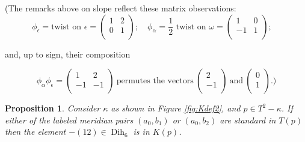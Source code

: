 \documentclass[12pt]{amsart}
\newtheorem{prop}[thm]{Proposition}
\newcommand{\Dih}{\operatorname{Dih}}
\begin{document}
(The remarks above on slope reflect these matrix observations: 
\begin{equation*}
\phi_{\epsilon} =\text{twist on }\epsilon = 
\begin{pmatrix}
1 & 2  \\
0 & 1 \\
\end{pmatrix}; \quad
\phi_\alpha = \frac12\text{ twist on }\omega = 
\begin{pmatrix}
1 & 0  \\
-1 & 1 \\
\end{pmatrix} ; \quad
\end{equation*}

and, up to sign, their composition %

\begin{equation*}
\phi_{\alpha}\phi_{\epsilon}=
\begin{pmatrix}
1 & 2  \\
-1 & -1 \\
\end{pmatrix}\:
\text{permutes the vectors}\:
\begin{pmatrix}
2  \\
 -1 \\
\end{pmatrix} \: \text{and} \:
\begin{pmatrix}
0  \\
 1 \\
\end{pmatrix} .)
\end{equation*}

    \begin{prop} \label{prop:-12} Consider $\kappa$ as shown in Figure \ref{fig:Kdef2}, and $p \in T^2 - \kappa$.  If either of the labeled meridian pairs $(a_0, b_1)$ or $(a_0, b_2)$ are standard in $T(p)$ then the element $-(12) \in \Dih_6$ is in $K(p)$.      
    \end{prop}
    
\end{document}
